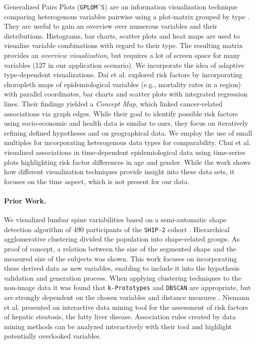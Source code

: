 \documentclass[journal]{style/vgtc} 			          %
\begin{document}
Generalized Pairs Plots (\texttt{GPLOM´S}) are an information visualization technique comparing heterogenous variables pairwise using a plot-matrix grouped by type \cite{GPLOMS, Francois2013}.
They are useful to gain an overview over numerous variables and their distributions.
Histograms, bar charts, scatter plots and heat maps are used to visualize variable combinations with regard to their type.
The resulting matrix provides an \emph{overview visualization}, but requires a lot of screen space for many variables (127 in our application scenario).
We incorporate the idea of adaptive type-dependent visualizations.
Dai et al. \cite{Dai2005} explored risk factors by incorporating choropleth maps of epidemiological variables (e.g., mortality rates in a region) with parallel coordinates, bar charts and scatter plots with integrated regression lines.
Their findings yielded a \emph{Concept Map}, which linked cancer-related associations via graph edges.
While their goal to identify possible risk factors using socio-economic and health data is similar to ours, they focus on iteratively refining defined hypotheses and on geographical data.
We employ the use of small multiples for incorporating heterogenous data types for comparability.
Chui et al. \cite{Chui2011} visualized associations in time-dependent epidemiological data using time-series plots highlighting risk factor differences in age and gender.
While the work shows how different visualization techniques provide insight into these data sets, it focuses on the time aspect, which is not present for our data.
\paragraph{Prior Work.}
We visualized lumbar spine variabilities based on a semi-automatic shape detection algorithm of 490 participants of the \texttt{SHIP-2} cohort \cite{Klemm2013VMV}.
%
Hierarchical agglomerative clustering divided the population into shape-related groups.
%
As proof of concept, a relation between the size of the segmented shape and the measured size of the subjects was shown.
%
This work focuses on incorporating these derived data as new variables, enabling to include it into the hypothesis validation and generation process.
%
When applying clustering techniques to the non-image data it was found that \texttt{k-Prototypes} and \texttt{DBSCAN} are appropriate, but are strongly dependent on the chosen variables and distance measures \cite{Klemm2014BVM}.
%
Niemann et al. \cite{Niemann2014} presented an interactive data mining tool for the assessment of risk factors of hepatic steatosis, the fatty liver disease.
%
Association rules created by data mining methods can be analyzed interactively with their tool and highlight potentially overlooked variables.
\end{document}
